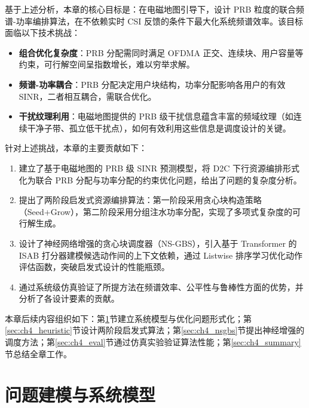 \documentclass[type=master]{fduthesis}
\begin{document}
基于上述分析，本章的核心目标是：在电磁地图引导下，设计 PRB 粒度的联合频谱-功率编排算法，在不依赖实时 CSI 反馈的条件下最大化系统频谱效率。该目标面临以下技术挑战：

\begin{itemize}
\item \textbf{组合优化复杂度}：PRB 分配需同时满足 OFDMA 正交、连续块、用户容量等约束，可行解空间呈指数增长，难以穷举求解。

\item \textbf{频谱-功率耦合}：PRB 分配决定用户块结构，功率分配影响各用户的有效 SINR，二者相互耦合，需联合优化。

\item \textbf{干扰纹理利用}：电磁地图提供的 PRB 级干扰信息蕴含丰富的频域纹理（如连续干净子带、孤立低干扰点），如何有效利用这些信息是调度设计的关键。
\end{itemize}

针对上述挑战，本章的主要贡献如下：

\begin{enumerate}
\item 建立了基于电磁地图的 PRB 级 SINR 预测模型，将 D2C 下行资源编排形式化为联合 PRB 分配与功率分配的约束优化问题，给出了问题的复杂度分析。

\item 提出了两阶段启发式资源编排算法：第一阶段采用贪心块构造策略（Seed+Grow），第二阶段采用分组注水功率分配，实现了多项式复杂度的可行解生成。

\item 设计了神经网络增强的贪心块调度器（NS-GBS），引入基于 Transformer 的 ISAB 打分器建模候选动作间的上下文依赖，通过 Listwise 排序学习优化动作评估函数，突破启发式设计的性能瓶颈。

\item 通过系统级仿真验证了所提方法在频谱效率、公平性与鲁棒性方面的优势，并分析了各设计要素的贡献。
\end{enumerate}

本章后续内容组织如下：第\ref{sec:ch4_model}节建立系统模型与优化问题形式化；第\ref{sec:ch4_heuristic}节设计两阶段启发式算法；第\ref{sec:ch4_nsgbs}节提出神经增强的调度方法；第\ref{sec:ch4_eval}节通过仿真实验验证算法性能；第\ref{sec:ch4_summary}节总结全章工作。

\section{问题建模与系统模型}
\label{sec:ch4_model}
\end{document}
